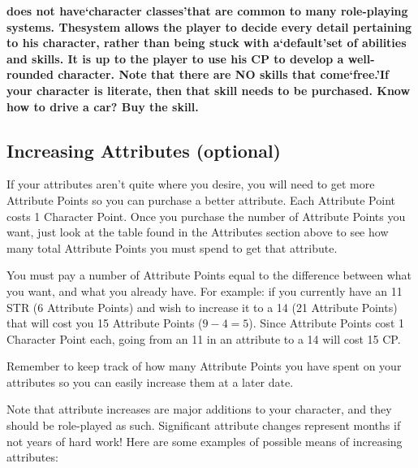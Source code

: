 \documentclass[twoside]{book}
\begin{document}
 \textbf{\APATHY{}does not have`character classes'that are common to many role-playing systems. The\APATHY{}system allows the player to decide every detail pertaining to his character, rather than being stuck with a`default'set of abilities and skills. It is up to the player to use his CP to develop a well-rounded character. Note that there are NO skills that come`free.'If your character is literate, then that skill needs to be purchased. Know how to drive a car? Buy the skill.}


    

\subsection{Increasing Attributes (optional)}
    
    {  
    If your attributes aren't quite where you desire, you will need to get more Attribute Points so you can purchase a better attribute. Each Attribute Point costs 1 Character Point. Once you purchase the number of Attribute Points you want, just look at the table found in the Attributes section above to see how many total Attribute Points you must spend to get that attribute.
    }
  
    {  
    You must pay a number of Attribute Points equal to the difference between what you want, and what you already have. For example: if you currently have an 11 STR (6 Attribute Points) and wish to increase it to a 14 (21 Attribute Points) that will cost you 15 Attribute Points (\begin{math}9-4=5\end{math}). Since Attribute Points cost 1 Character Point each, going from an 11 in an attribute to a 14 will cost 15 CP.
    }
  
    {  
    Remember to keep track of how many Attribute Points you have spent on your attributes so you can easily increase them at a later date.
    }
  
    {  
    Note that attribute increases are major additions to your character, and they should be role-played as such. Significant attribute changes represent months if not years of hard work! Here are some examples of possible means of increasing attributes:
    }
  
\end{document}
